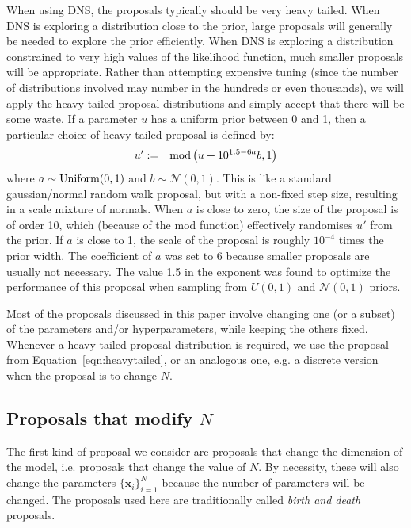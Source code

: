 \documentclass[letterpaper, 11pt]{article}
\newcommand{\xx}{\mathbf{x}}
\begin{document}
When using DNS,
the proposals typically should be very heavy tailed. When
DNS is exploring a distribution close to the prior, large proposals will
generally be needed to explore the prior efficiently.
When DNS is exploring a distribution constrained to
very high values of the likelihood function, much smaller proposals will be
appropriate. Rather than attempting expensive tuning (since the number of
distributions involved may number in the hundreds or even thousands), we will
apply the heavy tailed proposal distributions and simply accept that there will
be some waste. If a parameter $u$ has a uniform prior between 0 and 1, then
a particular choice of heavy-tailed proposal is defined by:
\begin{eqnarray}
u' &:=& \textnormal{mod}\left(u + 10^{1.5 - 6a}b, 1\right)\label{eqn:heavytailed}
\end{eqnarray}
where $a \sim \textnormal{Uniform}(0, 1)$ and $b\sim \mathcal{N}(0,1)$.
This is like a standard gaussian/normal random walk proposal, but with a
non-fixed step size, resulting in a scale mixture of normals.
When
$a$ is close to zero, the size of the proposal is of order 10, which (because
of the mod function) effectively randomises $u'$ from the prior. If $a$ is
close to 1, the scale of the proposal is roughly $10^{-4}$ times the prior
width. The coefficient of $a$ was set to 6 because smaller proposals are
usually not necessary. The value 1.5 in the exponent was found to optimize the
performance of this proposal when sampling from $U(0, 1)$ and $\mathcal{N}(0,1)$
priors.

Most of the proposals discussed in this paper involve changing one
(or a subset) of the parameters and/or hyperparameters, while keeping the
others fixed. Whenever a heavy-tailed proposal distribution
is required, we use the proposal from Equation~\ref{eqn:heavytailed},
or an analogous one, e.g. a discrete version when the proposal is to change $N$.


\subsection{Proposals that modify $N$}\label{sec:proposal1}
The first kind of proposal we consider are proposals that change the
dimension of the model, i.e. proposals that change the value of $N$. By
necessity, these will also change the parameters $\{\xx_i\}_{i=1}^N$ because
the number of parameters will be changed. The proposals used here are
traditionally called {\it birth and death} proposals.
\end{document}
